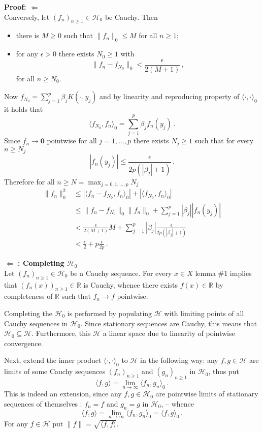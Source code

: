 \documentclass[a4paper]{article}
\newcommand{\Real}{\mathbb{R}}
\newcommand{\nil}{\mathbf{0}}
\newcommand{\Hcal}{\mathcal{H}}
\begin{document}
\noindent\textbf{Proof: $\Leftarrow$} \hfill\\
Conversely, let $(f_n)_{n\geq1}\in \Hcal_0$ be Cauchy. Then \begin{itemize}
	\item there is $M\geq 0$ such that $\|f_n\|_0\leq M$ for all $n\geq 1$;
	\item for any $\epsilon>0$ there exists $N_0\geq1$ with
		\[ \|f_n - f_{N_0} \|_0 < \frac{\epsilon}{2(M+1)}\,, \]
		for all $n\geq N_0$.
\end{itemize}
Now $f_{N_0} = \sum_{j=1}^p \beta_j K(\cdot,y_j)$ and by linearity and reproducing
property of $\langle \cdot, \cdot\rangle_0$ it holds that
\[ \langle f_{N_0}, f_n \rangle_0 = \sum_{j=1}^p \beta_j f_n(y_j) \,. \]
Since $f_n \to \nil$ pointwise for all $j=1,\ldots,p$ there exists $N_j\geq 1$
such that for every $n\geq N_j$
\[ |f_n(y_j)| \leq \frac{\epsilon}{2 p ( |\beta_j| + 1 ) }\,. \]
Therefore for all $n \geq N = \max_{j=0,1,\ldots,p}N_j$
\begin{align*}
	\|f_n\|_0^2
	& \leq |\langle f_n-f_{N_0},f_n \rangle_0| + |\langle f_{N_0}, f_n \rangle_0| \\
	& \leq \|f_n-f_{N_0}\|_0 \|f_n\|_0 + \sum_{j=1}^p |\beta_j| |f_n(y_j)| \\
	& < \frac{\epsilon}{2(M+1)} M + \sum_{j=1}^p |\beta_j| \frac{\epsilon}{2 p ( |\beta_j| + 1 ) } \\
	& < \frac{\epsilon}{2} + p\frac{\epsilon}{2p} \,.
\end{align*}

\noindent \textbf{ $\Leftarrow$ : Completing $\Hcal_0$}\hfill\\
Let $(f_n)_{n\geq1}\in \Hcal_0$ be a Cauchy sequence. For every $x\in X$ lemma \#1
implies that $(f_n(x))_{n\geq1}\in\Real$ is Cauchy, whence there exists $f(x)\in \Real$
by completeness of $\Real$ such that $f_n\to f$ pointwise.

Completing the $\Hcal_0$ is performed by populating $\Hcal$ with limiting points
of all Cauchy sequences in $\Hcal_0$. Since stationary sequences are Cauchy, this
means that $\Hcal_0\subseteq \Hcal$. Furthermore, this $\Hcal$ a linear space due to
linearity of pointwise convergence.

Next, extend the inner product $\langle\cdot,\cdot\rangle_0$ to $\Hcal$ in the following
way: any $f,g\in \Hcal$ are limits of some Cauchy sequences $(f_n)_{n\geq1}$ and
$(g_n)_{n\geq1}$ in $\Hcal_0$, thus put
\[
\langle f, g \rangle = \lim_{n\to \infty} \langle f_n, g_n \rangle_0\,.
\]
This is indeed an extension, since any $f, g \in \Hcal_0$ are pointwise limits of
stationary sequences of themselves : $f_n=f$ and $g_n=g$ in $\Hcal_0$, -- whence
\[
\langle f, g\rangle
= \lim_{n\to \infty} \langle f_n, g_n \rangle_0
= \langle f, g \rangle_0\,.
\]
For any $f\in \Hcal$ put $\|f\| = \sqrt{ \langle f,f\rangle}$.
\end{document}
